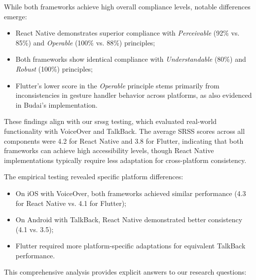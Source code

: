While both frameworks achieve high overall compliance levels, notable differences emerge:

\begin{itemize}
    \item React Native demonstrates superior compliance with \textit{Perceivable} (92\% vs. 85\%) and \textit{Operable} (100\% vs. 88\%) principles;
    \item Both frameworks show identical compliance with \textit{Understandable} (80\%) and \textit{Robust} (100\%) principles;
    \item Flutter's lower score in the \textit{Operable} principle stems primarily from inconsistencies in gesture handler behavior across platforms, as also evidenced in Budai's implementation.
\end{itemize}

These findings align with our \gls{srssg} testing, which evaluated real-world functionality with VoiceOver and TalkBack. The average SRSS scores across all components were 4.2 for React Native and 3.8 for Flutter, indicating that both frameworks can achieve high accessibility levels, though React Native implementations typically require less adaptation for cross-platform consistency.

The empirical testing revealed specific platform differences:

\begin{itemize}
    \item On iOS with VoiceOver, both frameworks achieved similar performance (4.3 for React Native vs. 4.1 for Flutter);
    \item On Android with TalkBack, React Native demonstrated better consistency (4.1 vs. 3.5);
    \item Flutter required more platform-specific adaptations for equivalent TalkBack performance.
\end{itemize}

This comprehensive analysis provides explicit answers to our research questions:

